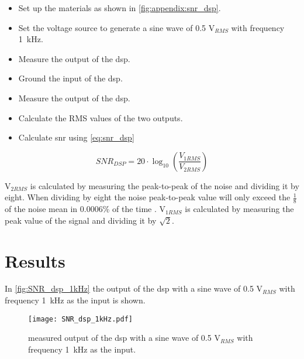 \begin{itemize}
	\item Set up the materials as shown in \autoref{fig:appendix:snr_dsp}.
	\item Set the voltage source to generate a sine wave of 0.5 V$_{RMS}$ with frequency \SI{1}{\kilo\hertz}.
	\item Measure the output of the \gls{dsp}.
	\item Ground the input of the \gls{dsp}.
	\item Measure the output of the \gls{dsp}.
	\item Calculate the RMS values of the two outputs.
	\item Calculate \gls{snr} using \autoref{eq:snr_dsp}
\end{itemize}

\begin{equation}\label{eq:snr_dsp}
        SNR_{DSP} = 20 \cdot \log_{10}\left(\frac{V_{1RMS}}{V_{2RMS}}\right)
    \end{equation}
    
    \startexplain
    \stopexplain
    
V$_{2RMS}$ is calculated by measuring the peak-to-peak of the noise and dividing it by eight. When dividing by eight the noise peak-to-peak value will only exceed the $\frac{1}{8}$ of the noise mean in 0.0006\% of the time \citep{rms_noise}.
V$_{1RMS}$ is calculated by measuring the peak value of the signal and dividing it by $\sqrt{2}$. 

\section{Results}
In \autoref{fig:SNR_dsp_1kHz} the output of the \gls{dsp} with a sine wave of 0.5 V$_{RMS}$ with frequency \SI{1}{\kilo\hertz} as the input is shown. 

\begin{figure}[H]
  \centering
  \texttt{[image: SNR\_dsp\_1kHz.pdf]}
  \caption{measured output of the \gls{dsp} with a sine wave of 0.5 V$_{RMS}$ with frequency \SI{1}{\kilo\hertz} as the input.}
  \label{fig:SNR_dsp_1kHz}
\end{figure}

